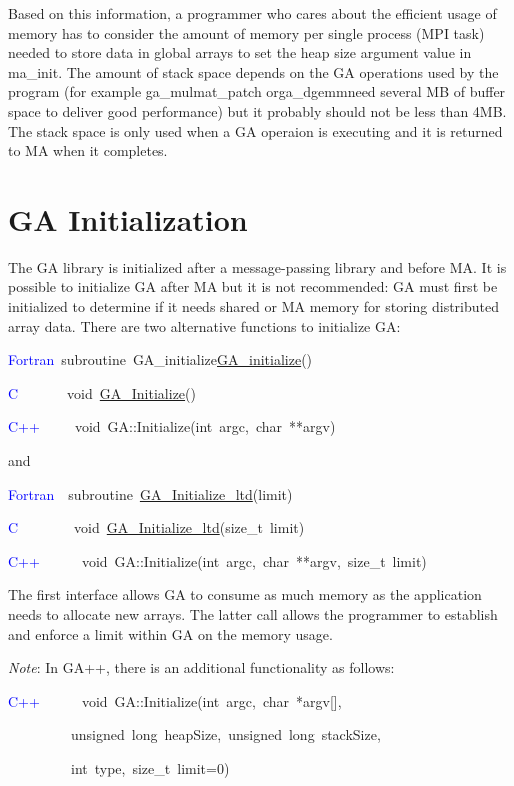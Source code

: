 Based on this information, a programmer who cares about the efficient
usage of memory has to consider the amount of memory per single process
(MPI task) needed to store data in global arrays to set the heap size
argument value in ma\_init. The amount of stack space depends on the
GA operations used by the program (for example ga\_mulmat\_patch orga\_dgemmneed
several MB of buffer space to deliver good performance) but it probably
should not be less than 4MB. The stack space is only used when a GA
operaion is executing and it is returned to MA when it completes. 


\section{GA Initialization }

The GA library is initialized after a message-passing library and
before MA. It is possible to initialize GA after MA but it is not
recommended: GA must first be initialized to determine if it needs
shared or MA memory for storing distributed array data. There are
two alternative functions to initialize GA:
\begin{lyxcode}
\textcolor{blue}{Fortran}~subroutine~GA\_initialize\href{http://www.emsl.pnl.gov/docs/global/ga_ops.html\#ga_initialize}{GA\_{}initialize}()~

\textcolor{blue}{C}~~~~~~~void~\href{http://www.emsl.pnl.gov/docs/global/c_nga_ops.html\#ga_initialize}{GA\_{}Initialize}()~

\textcolor{blue}{C++}~~~~~void~GA::Initialize(int~argc,~char~{*}{*}argv)
\end{lyxcode}
and
\begin{lyxcode}
\textcolor{blue}{Fortran}~~subroutine~\href{http://www.emsl.pnl.gov/docs/global/ga_ops.html\#ga_initialize_ltd}{GA\_{}Initialize\_{}ltd}(limit)~~

\textcolor{blue}{C}~~~~~~~~void~\href{http://www.emsl.pnl.gov/docs/global/c_nga_ops.html\#ga_initialize_ltd}{GA\_{}Initialize\_{}ltd}(size\_t~limit)~

\textcolor{blue}{C++~}~~~~~void~GA::Initialize(int~argc,~char~{*}{*}argv,~size\_t~limit)
\end{lyxcode}
The first interface allows GA to consume as much memory as the application
needs to allocate new arrays. The latter call allows the programmer
to establish and enforce a limit within GA on the memory usage.

\emph{Note}: In GA++, there is an additional functionality as follows: 
\begin{lyxcode}
\textcolor{blue}{C++}~~~~~~void~GA::Initialize(int~argc,~char~{*}argv{[}{]},~

~~~~~~~~~unsigned~long~heapSize,~unsigned~long~stackSize,

~~~~~~~~~int~type,~size\_t~limit=0)~
\end{lyxcode}


